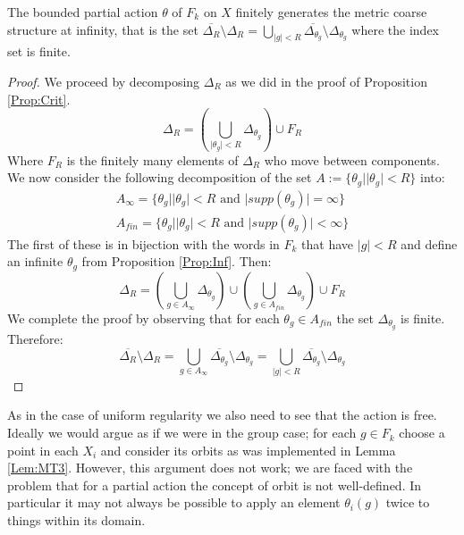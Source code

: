 \begin{corollary}
The bounded partial action $\theta$ of $F_{k}$ on $X$ finitely generates the metric coarse structure at infinity, that is the set $\overline{\Delta_{R}}\setminus \Delta_{R} = \bigcup_{\vert g \vert < R}\overline{\Delta_{\theta_{g}}}\setminus \Delta_{\theta_{g}}$ where the index set is finite.
\end{corollary}
\begin{proof}
We proceed by decomposing $\Delta_{R}$ as we did in the proof of Proposition \ref{Prop:Crit}.
\begin{equation*}
\Delta_{R}=(\bigcup_{\vert \theta_{g} \vert < R}\Delta_{\theta_{g}})\cup F_{R}
\end{equation*}
Where $F_{R}$ is the finitely many elements of $\Delta_{R}$ who move between components. We now consider the following decomposition of the set $A:=\lbrace \theta_{g} | \vert \theta_{g}\vert < R\rbrace$ into:
\begin{eqnarray*}
A_{\infty}=\lbrace \theta_{g} | \vert \theta_{g} \vert < R \mbox{ and } \vert supp(\theta_{g})\vert = \infty \rbrace \\
A_{fin}=\lbrace \theta_{g} | \vert \theta_{g} \vert < R\mbox{ and } \vert supp(\theta_{g})\vert < \infty \rbrace
\end{eqnarray*}
The first of these is in bijection with the words in $F_{k}$ that have $\vert g \vert < R$ and define an infinite $\theta_{g}$ from Proposition \ref{Prop:Inf}. Then:
\begin{equation*}
\Delta_{R}=(\bigcup_{g \in A_{\infty}}\Delta_{\theta_{g}})\cup (\bigcup_{g \in A_{fin}}\Delta_{\theta_{g}}) \cup F_{R}
\end{equation*}
We complete the proof by observing that for each $\theta_{g} \in A_{fin}$ the set $\Delta_{\theta_{g}}$ is finite. Therefore:
\begin{equation*}
\overline{\Delta_{R}}\setminus \Delta_{R} = \bigcup_{g \in A_{\infty}}\overline{\Delta_{\theta_{g}}}\setminus \Delta_{\theta_{g}}= \bigcup_{\vert g \vert < R}\overline{\Delta_{\theta_{g}}}\setminus \Delta_{\theta_{g}}
\end{equation*}\end{proof}

As in the case of uniform regularity we also need to see that the action is free. Ideally we would argue as if we were in the group case; for each $g \in F_{k}$ choose a point in each $X_{i}$ and consider its orbits as was implemented in Lemma \ref{Lem:MT3}. However, this argument does not work; we are faced with the problem that for a partial action the concept of orbit is not well-defined. In particular it may not always be possible to apply an element $\theta_{i}(g)$ twice to things within its domain. 


